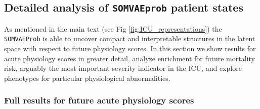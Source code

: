 
\subsection{Detailed analysis of \texttt{SOMVAEprob} patient states}
\label{subsec:detailed_icu}

As mentioned in the main text (see Fig \ref{fig:ICU_representations}) the \texttt{SOMVAEProb}
is able to uncover compact and interpretable structures in the latent space with respect
to future physiology scores. In this section we show results for acute physiology scores
in greater detail, analyze enrichment for future mortality risk, arguably the most
important severity indicator in the ICU, and explore phenotypes for particular 
physiological abnormalities.


\subsubsection*{Full results for future acute physiology scores}

